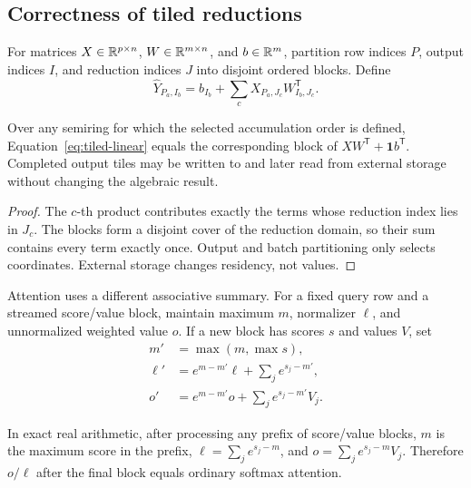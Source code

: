 \subsection{Correctness of tiled reductions}

For matrices $X\in\mathbb{R}^{p\times n}$, $W\in\mathbb{R}^{m\times n}$, and $b\in\mathbb{R}^m$, partition row indices $P$, output indices $I$, and reduction indices $J$ into disjoint ordered blocks. Define
\begin{equation}
\label{eq:tiled-linear}
  \widehat Y_{P_a,I_b}
   = b_{I_b}
     +\sum_c X_{P_a,J_c}W_{I_b,J_c}^{\mathsf T}.
\end{equation}

\begin{proposition}
\label{prop:linear-correct}
Over any semiring for which the selected accumulation order is defined, Equation~\eqref{eq:tiled-linear} equals the corresponding block of $XW^{\mathsf T}+\mathbf 1b^{\mathsf T}$. Completed output tiles may be written to and later read from external storage without changing the algebraic result.
\end{proposition}

\begin{proof}
The $c$-th product contributes exactly the terms whose reduction index lies in $J_c$. The blocks form a disjoint cover of the reduction domain, so their sum contains every term exactly once. Output and batch partitioning only selects coordinates. External storage changes residency, not values.
\end{proof}

Attention uses a different associative summary. For a fixed query row and a streamed score/value block, maintain maximum $m$, normalizer $\ell$, and unnormalized weighted value $o$. If a new block has scores $s$ and values $V$, set
\begin{align}
  m' &= \max(m,\max s),\\
  \ell' &= e^{m-m'}\ell + \sum_j e^{s_j-m'},\\
  o' &= e^{m-m'}o + \sum_j e^{s_j-m'}V_j.
\end{align}

\begin{proposition}
\label{prop:online-softmax}
In exact real arithmetic, after processing any prefix of score/value blocks, $m$ is the maximum score in the prefix, $\ell=\sum_j e^{s_j-m}$, and $o=\sum_j e^{s_j-m}V_j$. Therefore $o/\ell$ after the final block equals ordinary softmax attention.
\end{proposition}

